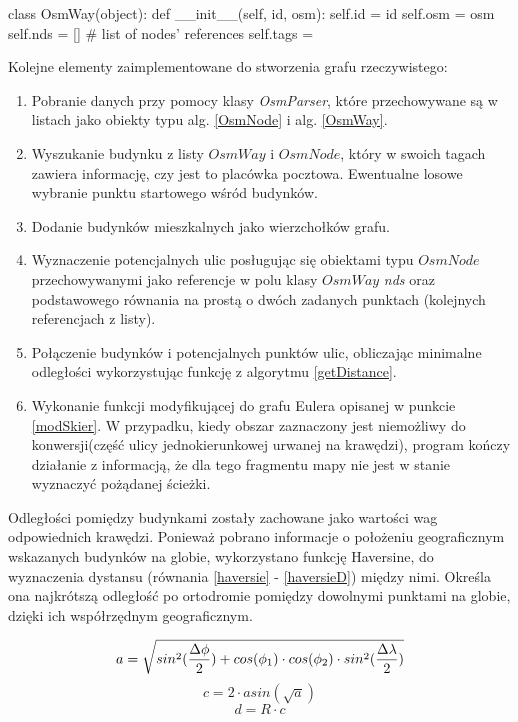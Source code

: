 \documentclass[a4paper, 12pt, twoside, openright]{article}
\begin{document}
\begin{algorithm}[caption={\textit{OsmWay} struktura tagu XML - $node$, w którym przechowywane są punkty.}, label={OsmWay}]
	class OsmWay(object):
		def __init__(self, id, osm):
			self.id = id
			self.osm = osm
			self.nds = []  # list of nodes' references
			self.tags = {}
\end{algorithm}

Kolejne elementy zaimplementowane do stworzenia grafu rzeczywistego:
\begin{enumerate}
	\item Pobranie danych przy pomocy klasy \textit{OsmParser}, które przechowywane są w listach jako obiekty typu alg. \ref{OsmNode} i alg. \ref{OsmWay}.   
	\item Wyszukanie budynku z listy $OsmWay$ i $OsmNode$, który w swoich tagach zawiera informację, czy jest to placówka pocztowa. Ewentualne losowe wybranie punktu startowego wśród budynków.
	\item Dodanie budynków mieszkalnych jako wierzchołków grafu.
	\item Wyznaczenie potencjalnych ulic posługując się obiektami typu $OsmNode$ przechowywanymi jako referencje w polu klasy $OsmWay$ \textit{nds} oraz podstawowego równania na prostą o dwóch zadanych punktach (kolejnych referencjach z listy).
	\item Połączenie budynków i potencjalnych punktów ulic, obliczając minimalne odległości wykorzystując funkcję z algorytmu \ref{getDistance}.
	\item Wykonanie funkcji modyfikującej do grafu Eulera opisanej w punkcie \ref{modSkier}. W przypadku, kiedy obszar zaznaczony jest niemożliwy do konwersji(część ulicy jednokierunkowej urwanej na krawędzi), program kończy działanie z informacją, że dla tego fragmentu mapy nie jest w stanie wyznaczyć pożądanej ścieżki.
\end{enumerate}



Odległości pomiędzy budynkami zostały zachowane jako wartości wag odpowiednich krawędzi. Ponieważ pobrano informacje o położeniu geograficznym wskazanych budynków na globie, wykorzystano funkcję Haversine\cite{haver}, do wyznaczenia dystansu (równania \ref{haversie} - \ref{haversieD}) między nimi. Określa ona najkrótszą odległość po ortodromie pomiędzy dowolnymi punktami na globie, dzięki ich współrzędnym geograficznym.

\begin{equation} \label{haversie}
	a = \sqrt{sin^2({{\Delta\phi}\over{2}}) + cos(\phi_1) \cdot cos(\phi_2) \cdot sin^2({{\Delta\lambda}\over{2}})}
\end{equation}
\begin{equation} \label{haversieC}
	c = 2 \cdot asin(\sqrt{a})
\end{equation}
\begin{equation} \label{haversieD}
	d = R \cdot c
\end{equation}
\end{document}

